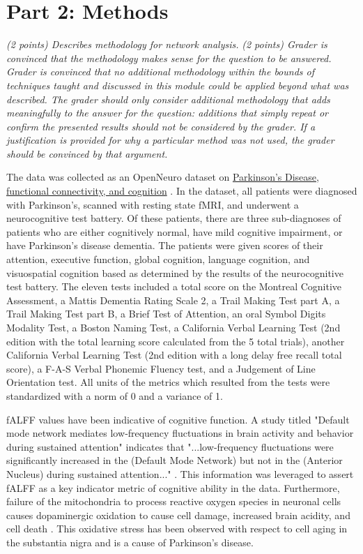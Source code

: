 \documentclass[12pt]{article}
\begin{document}
\section{Part 2: Methods}

\textit{ (2 points) Describes methodology for network analysis.}
\textit{(2 points) Grader is convinced that the methodology makes sense for the question to be answered. Grader is convinced that no additional methodology within the bounds of techniques taught and discussed in this module could be applied beyond what was described. The grader should only consider additional methodology that adds meaningfully to the answer for the question: additions that simply repeat or confirm the presented results should not be considered by the grader. If a justification is provided for why a particular method was not used, the grader should be convinced by that argument. }

The data was collected as an OpenNeuro dataset on \href{https://openneuro.org/datasets/ds004392/versions/1.0.0}{Parkinson's Disease, functional connectivity, and cognition} \cite{ds004392:1.0.0}. In the dataset, all patients were diagnosed with Parkinson's, scanned with resting state fMRI, and underwent a neurocognitive test battery. Of these patients, there are three sub-diagnoses of patients who are either cognitively normal, have mild cognitive impairment, or have Parkinson's disease dementia. The patients were given scores of their attention, executive function, global cognition, language cognition, and visuospatial cognition based as determined by the results of the neurocognitive test battery. The eleven tests included a total score on the Montreal Cognitive Assessment, a Mattis Dementia Rating Scale 2, a Trail Making Test part A, a Trail Making Test part B, a Brief Test of Attention, an oral Symbol Digits Modality Test, a Boston Naming Test, a California Verbal Learning Test (2nd edition with the total learning score calculated from the 5 total trials), another California Verbal Learning Test (2nd edition with a long delay free recall total score), a F-A-S Verbal Phonemic Fluency test, and a Judgement of Line Orientation test. All units of the metrics which resulted from the tests were standardized with a norm of 0 and a variance of 1.

fALFF values have been indicative of cognitive function. A study titled "Default mode network mediates low‐frequency fluctuations in brain activity and behavior during sustained attention" indicates that "...low‐frequency fluctuations were significantly increased in the (Default Mode Network) but not in the (Anterior Nucleus) during sustained attention..." \cite{35903957}. This information was leveraged to assert fALFF as a key indicator metric of cognitive ability in the data. Furthermore, failure of the mitochondria to process reactive oxygen species in neuronal cells causes dopaminergic oxidation to cause cell damage, increased brain acidity, and cell death \cite{https://doi.org/10.1111/acel.13031}. This oxidative stress has been observed with respect to cell aging in the substantia nigra and is a cause of Parkinson's disease.
\end{document}
